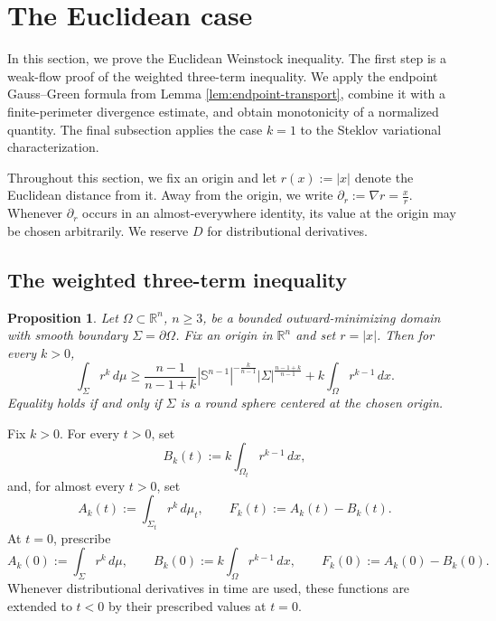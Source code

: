 \documentclass[10pt,a4paper]{amsart}
\numberwithin{equation}{section}
\newtheorem{proposition}[theorem]{Proposition}
\newcommand{\R}{\mathbb R}
\newcommand{\Sn}{\mathbb S}
\newcommand{\Om}{\Omega}
\newcommand{\Sig}{\Sigma}
\begin{document}
\section{The Euclidean case}\label{sec.3}

In this section, we prove the Euclidean Weinstock inequality.  The first step is a weak-flow proof of the weighted three-term inequality.  We apply the endpoint Gauss--Green formula from Lemma \ref{lem:endpoint-transport}, combine it with a finite-perimeter divergence estimate, and obtain monotonicity of a normalized quantity. The final subsection applies the case $k=1$ to the Steklov variational characterization.

Throughout this section, we fix an origin and let $r(x):=|x|$ denote the Euclidean distance from it. Away from the origin, we write $\partial_r:=\nabla r=\frac{x}{r}$. Whenever $\partial_r$ occurs in an almost-everywhere identity, its value at the origin may be chosen arbitrarily. We reserve $D$ for
distributional derivatives.

\subsection{The weighted three-term inequality}

\begin{proposition}\label{prop:weighted-three-term}
Let $\Om\subset\R^n$, $n\geq3$, be a bounded outward-minimizing domain with smooth boundary $\Sig=\partial\Om$.  Fix an origin in $\R^n$ and set $r=|x|$.  Then for every $k>0$,
\begin{equation}\label{eq:weighted-main}
    \int_\Sig r^k\,d\mu
    \geq
    \frac{n-1}{n-1+k}|\Sn^{n-1}|^{-\frac{k}{n-1}}
    |\Sig|^{\frac{n-1+k}{n-1}}
    + k\int_\Om r^{k-1}\,dx.
\end{equation}
Equality holds if and only if $\Sig$ is a round sphere centered at the chosen origin.
\end{proposition}

Fix $k>0$. For every $t>0$, set
\begin{equation*}
    B_k(t):=k\int_{\Om_t}r^{k-1}\,dx,
\end{equation*}
and, for almost every $t>0$, set
\begin{equation*}
    A_k(t):=\int_{\Sig_t}r^k\,d\mu_t,
    \qquad
    F_k(t):=A_k(t)-B_k(t).
\end{equation*}
At $t=0$, prescribe
\begin{equation*}
    A_k(0):=\int_{\Sig}r^k\,d\mu,
    \qquad
    B_k(0):=k\int_{\Om}r^{k-1}\,dx,
    \qquad
    F_k(0):=A_k(0)-B_k(0).
\end{equation*}
Whenever distributional derivatives in time are used, these functions are extended to $t<0$ by their prescribed values at $t=0$.
\end{document}
